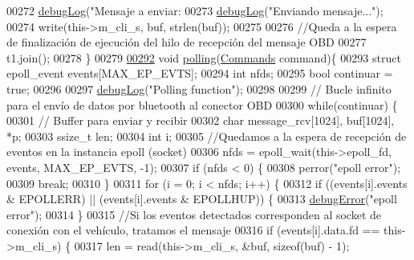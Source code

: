 \begin{DoxyCode}
{{{{{{00272         \hyperlink{debug_8hpp_a55f41cf7b0585224496de3d7adbc101c}{debugLog}(\textcolor{stringliteral}{"Mensaje a enviar: %
00273         \hyperlink{debug_8hpp_a55f41cf7b0585224496de3d7adbc101c}{debugLog}(\textcolor{stringliteral}{"Enviando mensaje..."});
00274         write(this->m\_cli\_s, buf, strlen(buf));
00275         
00276         \textcolor{comment}{//Queda a la espera de finalización de ejecución del hilo de recepción del mensaje OBD}
00277         t1.join();
00278     \}
00279 
\hyperlink{classObd_a0792ecb9247f32760269fdf64a178f8f}{00292}     \textcolor{keywordtype}{void} \hyperlink{classObd_a0792ecb9247f32760269fdf64a178f8f}{polling}(\hyperlink{classCommands}{Commands} command)\{
00293         \textcolor{keyword}{struct }epoll\_event events[MAX\_EP\_EVTS];
00294         \textcolor{keywordtype}{int} nfds;
00295         \textcolor{keywordtype}{bool} continuar = \textcolor{keyword}{true};
00296 
00297         \hyperlink{debug_8hpp_a55f41cf7b0585224496de3d7adbc101c}{debugLog}(\textcolor{stringliteral}{"Polling function"});
00298 
00299         \textcolor{comment}{// Bucle infinito para el envío de datos por bluetooth al conector OBD}
00300         \textcolor{keywordflow}{while}(continuar) \{
00301         \textcolor{comment}{// Buffer para enviar y recibir}
00302             \textcolor{keywordtype}{char} message\_rcv[1024], buf[1024], *p;
00303             ssize\_t len;
00304             \textcolor{keywordtype}{int} i;
00305             \textcolor{comment}{//Quedamos a la espera de recepción de eventos en la instancia epoll (socket)}
00306             nfds = epoll\_wait(this->epoll\_fd, events, MAX\_EP\_EVTS, -1);
00307             \textcolor{keywordflow}{if} (nfds < 0) \{
00308                 perror(\textcolor{stringliteral}{"epoll error"});
00309                 \textcolor{keywordflow}{break};
00310             \}
00311             \textcolor{keywordflow}{for} (i = 0; i < nfds; i++) \{
00312                 \textcolor{keywordflow}{if} ((events[i].events & EPOLLERR) || (events[i].events & EPOLLHUP)) \{
00313                     \hyperlink{debug_8hpp_a06cd512b8b15b6da31a5a557445f7027}{debugError}(\textcolor{stringliteral}{"epoll error"});
00314                 \}
00315                 \textcolor{comment}{//Si los eventos detectados corresponden al socket de conexión con el vehículo, tratamos el
       mensaje}
00316                 \textcolor{keywordflow}{if} (events[i].data.fd == this->m\_cli\_s) \{
00317                     len = read(this->m\_cli\_s, &buf, \textcolor{keyword}{sizeof}(buf) - 1);
}}}}}}}
\end{DoxyCode}
